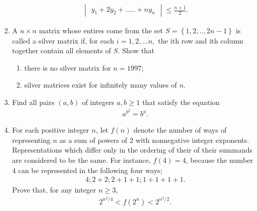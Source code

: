 \documentclass[12pt,-letter paper]{article}
\providecommand{\mydet}[1]{\ensuremath{\begin{vmatrix}#1\end{vmatrix}}}
\providecommand{\cbrak}[1]{\ensuremath{\left\{#1\right\}}}
\begin{document}
\begin{enumerate}
\begin{align*}
\mydet{y_1+2y_2+.....+ny_n}\leq\frac{n+1}{2}.
\end{align*}
\item A \(n\times n\) matrix whose entires come from the set $S = \cbrak{1,2,..,2n-1}$ is called a silver matrix if, for each $i=1,2,...n,$ the ith row and ith column together contain all elements of $S$. Show that 
\begin{enumerate}
\item there is no silver matrix for $n=1997$;
\item silver matrices exist for infinitely many values of $n$.
\end{enumerate}
\item Find all pairs $(a,b)$ of integers $a,b \geq 1$ that satisfy the equation 
\begin{align*}
a^{b^2}=b^{a}.
\end{align*}
\item For each positive integer $n$, let $f(n)$ denote the number of ways of representing $n$ as a sum of powers of $2$ with nonnegative integer exponents. Representations which differ only in the ordering of their of their summands are considered to be the same. For instance, $f(4)=4$, because the number $4$ can be represented in the following four ways;
\begin{align*}
4;2 + 2;2 + 1 + 1;1 + 1 + 1 + 1.
\end{align*}
Prove that, for any integer $n \geq{3}$,
\begin{align*}
2^{n^2/4} < f(2^n)<2^{n^2/2}.
\end{align*}
\end{enumerate}
\end{document}
